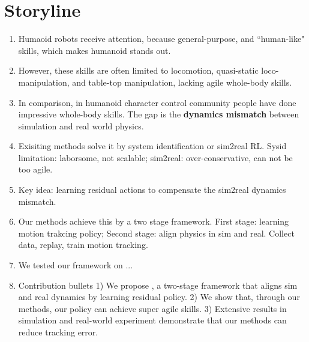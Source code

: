 \section{Storyline}



\begin{enumerate}
    \item Humaoid robots receive attention, because general-purpose, and ``human-like" skills, which makes humanoid stands out.
    \item However, these skills are often limited to locomotion, quasi-static loco-manipulation, and table-top manipulation, lacking agile whole-body skills.
    \item In comparison, in humanoid character control community people have done impressive whole-body skills. The gap is the \textbf{dynamics mismatch} between simulation and real world physics.
    \item Exisiting methods solve it by system identification or sim2real RL. Sysid limitation: laborsome, not scalable; sim2real: over-conservative, can not be too agile.
    \item Key idea: learning residual actions to compensate the sim2real dynamics mismatch.
    \item Our methods achieve this by a two stage framework. First stage: learning motion trakcing policy; Second stage: align physics in sim and real. Collect data, replay, train motion tracking.
    \item We tested our framework on ...
    \item Contribution bullets 1) We propose \method, a two-stage framework that aligns sim and real dynamics by learning residual policy. 2) We show that, through our methods, our policy can achieve super agile skills. 3) Extensive results in simulation and real-world experiment demonstrate that our methods can reduce tracking error.
\end{enumerate}

